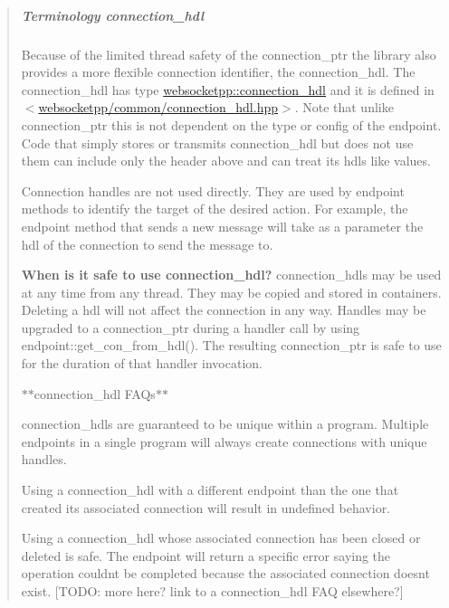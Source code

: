\begin{quote}
\subparagraph*{Terminology {\ttfamily connection\+\_\+hdl}}

Because of the limited thread safety of the {\ttfamily connection\+\_\+ptr} the library also provides a more flexible connection identifier, the {\ttfamily connection\+\_\+hdl}. The {\ttfamily connection\+\_\+hdl} has type {\ttfamily \hyperlink{namespacewebsocketpp_a6b3d26a10ee7229b84b776786332631d}{websocketpp\+::connection\+\_\+hdl}} and it is defined in {\ttfamily $<$\hyperlink{connection__hdl_8hpp_source}{websocketpp/common/connection\+\_\+hdl.\+hpp}$>$}. Note that unlike {\ttfamily connection\+\_\+ptr} this is not dependent on the type or config of the endpoint. Code that simply stores or transmits {\ttfamily connection\+\_\+hdl} but does not use them can include only the header above and can treat its hdls like values.

Connection handles are not used directly. They are used by endpoint methods to identify the target of the desired action. For example, the endpoint method that sends a new message will take as a parameter the hdl of the connection to send the message to.

{\bfseries When is it safe to use {\ttfamily connection\+\_\+hdl}?} {\ttfamily connection\+\_\+hdl}s may be used at any time from any thread. They may be copied and stored in containers. Deleting a hdl will not affect the connection in any way. Handles may be upgraded to a {\ttfamily connection\+\_\+ptr} during a handler call by using {\ttfamily endpoint\+::get\+\_\+con\+\_\+from\+\_\+hdl()}. The resulting {\ttfamily connection\+\_\+ptr} is safe to use for the duration of that handler invocation.

$\ast$$\ast${\ttfamily connection\+\_\+hdl} F\+A\+Qs$\ast$$\ast$
\begin{DoxyItemize}
\item {\ttfamily connection\+\_\+hdl}s are guaranteed to be unique within a program. Multiple endpoints in a single program will always create connections with unique handles.
\item Using a {\ttfamily connection\+\_\+hdl} with a different endpoint than the one that created its associated connection will result in undefined behavior.
\item Using a {\ttfamily connection\+\_\+hdl} whose associated connection has been closed or deleted is safe. The endpoint will return a specific error saying the operation couldn\textquotesingle{}t be completed because the associated connection doesn\textquotesingle{}t exist. \mbox{[}T\+O\+DO\+: more here? link to a connection\+\_\+hdl F\+AQ elsewhere?\mbox{]} 
\end{DoxyItemize}\end{quote}


